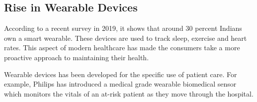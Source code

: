 \documentclass[10pt]{article}
\begin{document}
\subsection{Rise in Wearable Devices}

According to a recent survey in 2019, it shows that around 30 percent Indians own a smart wearable. These devices are used to track sleep, exercise and heart rates. This aspect of modern healthcare has made the consumers take a more proactive approach to maintaining their health.


Wearable devices has been developed for the specific use of patient care. For example, Philips has introduced a medical grade wearable biomedical sensor which monitors the vitals of an at-risk patient as they move through the hospital.
\end{document}
